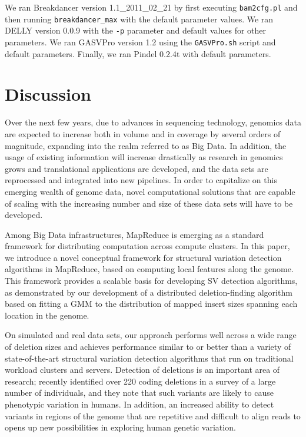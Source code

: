 \documentclass[11pt]{article}
\begin{document}
We ran Breakdancer version 1.1\_2011\_02\_21 by first executing \verb|bam2cfg.pl| and then running \verb|breakdancer_max| with the default parameter values. We ran DELLY version 0.0.9 with the \verb|-p| parameter and default values for other parameters. We ran GASVPro version 1.2 using the \verb|GASVPro.sh| script and default parameters. Finally, we ran Pindel 0.2.4t with default parameters.

\section{Discussion}\label{Discussion}

Over the next few years, due to advances in sequencing technology, genomics data are expected to increase both in volume and in coverage by several orders of magnitude, expanding into the realm referred to as Big Data. In addition, the usage of existing information will increase drastically as research in genomics grows and translational applications are developed, and the data sets are reprocessed and integrated into new pipelines. In order to capitalize on this emerging wealth of genome data, novel computational solutions that are capable of scaling with the increasing number and size of these data sets will have to be developed. 

Among Big Data infrastructures, MapReduce is emerging as a standard framework for distributing computation across compute clusters. In this paper, we introduce a novel conceptual framework for structural variation detection algorithms in MapReduce, based on computing local features along the genome. This framework provides a scalable basis for developing SV detection algorithms, as demonstrated by our development of a distributed deletion-finding algorithm based on fitting a GMM to the distribution of mapped insert sizes spanning each location in the genome. 

On simulated and real data sets, our approach performs well across a wide range of deletion sizes and achieves performance similar to or better than a variety of state-of-the-art structural variation detection algorithms that run on traditional workload clusters and servers. Detection of deletions is an important area of research; \textcite{Mills:2011fi} recently identified over 220 coding deletions in a survey of a large number of individuals, and they note that such variants are likely to cause phenotypic variation in humans. In addition, an increased ability to detect variants in regions of the genome that are repetitive and difficult to align reads to opens up new possibilities in exploring human genetic variation.
\end{document}

